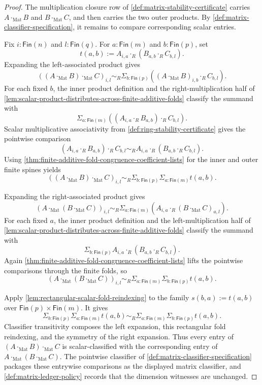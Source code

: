 \begin{proof}
The multiplication closure row of \autoref{def:matrix-stability-certificate} carries $A\cdot_{\mathrm{Mat}}B$ and $B\cdot_{\mathrm{Mat}}C$, and then carries the two outer products. By \autoref{def:matrix-classifier-specification}, it remains to compare corresponding scalar entries.

Fix $i:\mathsf{Fin}(n)$ and $l:\mathsf{Fin}(q)$. For $a:\mathsf{Fin}(m)$ and $b:\mathsf{Fin}(p)$, set
$$
t(a,b):=A_{i,a}\cdot_R(B_{a,b}\cdot_RC_{b,l}).
$$
Expanding the left-associated product gives
$$
((A\cdot_{\mathrm{Mat}}B)\cdot_{\mathrm{Mat}}C)_{i,l}
\sim_R
\Sigma_{b:\mathsf{Fin}(p)}((A\cdot_{\mathrm{Mat}}B)_{i,b}\cdot_RC_{b,l}).
$$
For each fixed $b$, the inner product definition and the right-multiplication half of \autoref{lem:scalar-product-distributes-across-finite-additive-folds} classify the summand with
$$
\Sigma_{a:\mathsf{Fin}(m)}((A_{i,a}\cdot_RB_{a,b})\cdot_RC_{b,l}).
$$
Scalar multiplicative associativity from \autoref{def:ring-stability-certificate} gives the pointwise comparison
$$
(A_{i,a}\cdot_RB_{a,b})\cdot_RC_{b,l}
\sim_R
A_{i,a}\cdot_R(B_{a,b}\cdot_RC_{b,l}).
$$
Using \autoref{thm:finite-additive-fold-congruence-coefficient-lists} for the inner and outer finite spines yields
$$
((A\cdot_{\mathrm{Mat}}B)\cdot_{\mathrm{Mat}}C)_{i,l}
\sim_R
\Sigma_{b:\mathsf{Fin}(p)}\Sigma_{a:\mathsf{Fin}(m)}t(a,b).
$$

Expanding the right-associated product gives
$$
(A\cdot_{\mathrm{Mat}}(B\cdot_{\mathrm{Mat}}C))_{i,l}
\sim_R
\Sigma_{a:\mathsf{Fin}(m)}(A_{i,a}\cdot_R(B\cdot_{\mathrm{Mat}}C)_{a,l}).
$$
For each fixed $a$, the inner product definition and the left-multiplication half of \autoref{lem:scalar-product-distributes-across-finite-additive-folds} classify the summand with
$$
\Sigma_{b:\mathsf{Fin}(p)}A_{i,a}\cdot_R(B_{a,b}\cdot_RC_{b,l}).
$$
Again \autoref{thm:finite-additive-fold-congruence-coefficient-lists} lifts the pointwise comparisons through the finite folds, so
$$
(A\cdot_{\mathrm{Mat}}(B\cdot_{\mathrm{Mat}}C))_{i,l}
\sim_R
\Sigma_{a:\mathsf{Fin}(m)}\Sigma_{b:\mathsf{Fin}(p)}t(a,b).
$$

Apply \autoref{lem:rectangular-scalar-fold-reindexing} to the family $s(b,a):=t(a,b)$ over $\mathsf{Fin}(p)\times\mathsf{Fin}(m)$. It gives
$$
\Sigma_{b:\mathsf{Fin}(p)}\Sigma_{a:\mathsf{Fin}(m)}t(a,b)
\sim_R
\Sigma_{a:\mathsf{Fin}(m)}\Sigma_{b:\mathsf{Fin}(p)}t(a,b).
$$
Classifier transitivity composes the left expansion, this rectangular fold reindexing, and the symmetry of the right expansion. Thus every entry of $(A\cdot_{\mathrm{Mat}}B)\cdot_{\mathrm{Mat}}C$ is scalar-classified with the corresponding entry of $A\cdot_{\mathrm{Mat}}(B\cdot_{\mathrm{Mat}}C)$. The pointwise classifier of \autoref{def:matrix-classifier-specification} packages these entrywise comparisons as the displayed matrix classifier, and \autoref{def:matrix-ledger-policy} records that the dimension witnesses are unchanged.
\end{proof}
